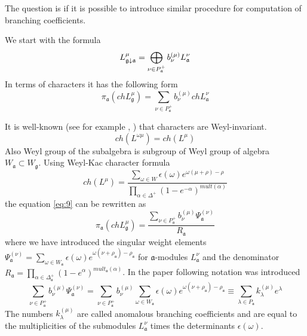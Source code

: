 \documentclass[a4paper,12pt]{article}
\theoremstyle{definition} \newtheorem{Def}{Definition}
\begin{document}
The question is if it is possible to introduce similar procedure for
computation of branching coefficients. 

We start with the formula
\begin{equation}
  \label{eq:6}
  L_{\frak{g}\downarrow \frak{a}}^{\mu }=\bigoplus\limits_{\nu \in P_{\frak{a}%
    }^{+}}b_{\nu }^{\left( \mu \right) }L_{\frak{a}}^{\nu }
\end{equation}
In terms of characters it has the following form
\begin{equation}
  \label{eq:9}
  \pi_{\mathfrak{a}}(ch L^{\mu}_{\mathfrak{g}})=\sum_{\nu\in P^{+}_{\mathfrak{a}}}b^{(\mu)}_{\nu} ch L^{\nu}_{\mathfrak{a}}
\end{equation}

It is well-known (see for example \cite{wakimoto2001idl}, \cite{kac1990idl}) that characters are Weyl-invariant.
\begin{equation}
  \label{eq:8}
  ch(L^{\omega\mu})=ch(L^{\mu})
\end{equation}
Also Weyl group of the subalgebra is subgroup of Weyl group of algebra $W_{\mathfrak{a}}\subset W_{\mathfrak{g}}$.
Using Weyl-Kac character formula
\begin{equation}
  \label{eq:11}
  ch(L^{\mu})=\frac{\sum_{\omega\in W}\epsilon(\omega)e^{\omega(\mu+\rho)-\rho}}{\prod_{\alpha\in \Delta^{+}}(1-e^{-\alpha})^{mult(\alpha)}}
\end{equation}
the equation \eqref{eq:9} can be rewritten as
\begin{equation}
  \label{eq:10}
  \pi_{\mathfrak{a}}(ch L^{\mu}_{\mathfrak{g}})=\frac{\sum_{\nu\in P^{+}_{\mathfrak{a}}}b^{(\mu)}_{\nu} \Psi^{(\nu)}_{\mathfrak{a}}}{R_{\mathfrak{a}}}
\end{equation}
where we have introduced the singular weight elements $\Psi^{(\nu)}_{\mathfrak{a}}=\sum_{\omega\in W_{\mathfrak{a}}}\epsilon(\omega)e^{\omega(\nu+\rho_{\mathfrak{a}})-\rho_{\mathfrak{a}}}$ for $\mathfrak{a}$-modules $L^{\nu}_{\mathfrak{a}}$ and the denominator $R_{\mathfrak{a}}=\prod_{\alpha\in \Delta^{+}_{\mathfrak{a}}}(1-e^{\alpha})^{mult_{\mathfrak{a}}(\alpha)}$. In the paper \cite{ilyin812pbc} following notation was introduced
\begin{equation}
  \label{eq:12}
  \sum_{\nu\in P^{+}_{\mathfrak{a}}}b^{(\mu)}_{\nu} \Psi^{(\nu)}_{\mathfrak{a}}
  =\sum_{\nu\in P^{+}_{\mathfrak{a}}}b^{(\mu)}_{\nu} \sum_{\omega\in W_{\mathfrak{a}}}\epsilon(\omega)e^{\omega(\nu+\rho_{\mathfrak{a}})-\rho_{\mathfrak{a}}}
  \equiv\sum_{\lambda\in P_{\mathfrak{a}}}k_{\lambda}^{(\mu)}e^{\lambda}
\end{equation}
The numbers $k_{\lambda}^{(\mu)}$ are called anomalous branching coefficients and are equal to the multiplicities of the submodules $L^{\nu}_{\mathfrak{a}}$ times the determinants $\epsilon(\omega)$.
\end{document}
